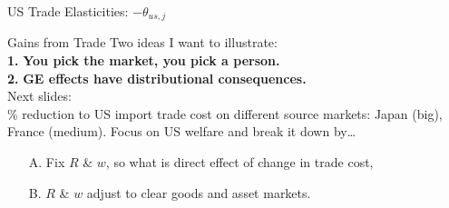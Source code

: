 \documentclass[9pt,pdftex,aspectratio=1610]{beamer}
\theoremstyle{definition}
\begin{document}

\begin{frame}[t]{US Trade Elasticities: $-\theta_{us,j}$}
\begin{figure}[!t]
\end{figure}
\end{frame}

\begin{frame}[t]{Gains from Trade}
\smallskip
Two ideas I want to illustrate:\\
\medskip
\textbf{1.} \textbf{You pick the market, you pick a person.}\\
\bigskip
\textbf{2.} \textbf{GE effects have distributional consequences.}\\
\bigskip
Next slides:\\
\% reduction to US import trade cost on different source markets: Japan (big), France (medium). Focus on US welfare and break it down by\ldots
\begin{itemize}
\smallskip
\item[A.] Fix $R$ \& $w$, so what is direct effect of change in trade cost,
\smallskip
\item[B.] $R$ \& $w$ adjust to clear goods and asset markets.
\end{itemize}
\end{frame}
\end{document}
